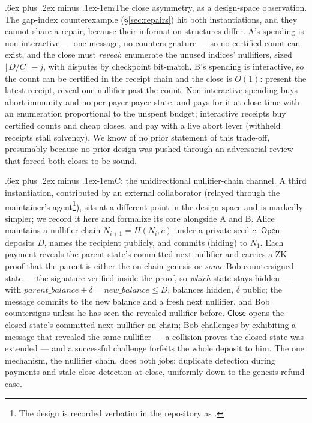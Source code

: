 \documentclass[9pt]{extarticle}
\makeatletter
\renewcommand\paragraph{\@startsection{paragraph}{4}{0pt}%
  {.6ex plus .2ex minus .1ex}{-1em}{\normalfont\normalsize\bfseries}}
\newcommand{\file}[1]{\path{#1}}
\makeatother
\begin{document}
\paragraph{The close asymmetry, as a design-space observation.} The
gap-index counterexample (\S\ref{sec:repairs}) hit both instantiations,
and they cannot share a repair, because their information structures
differ. A's spending is non-interactive --- one message, no
countersignature --- so no certified count can exist, and the close must
\emph{reveal}: enumerate the unused indices' nullifiers, sized
$\lfloor D/C \rfloor - j$, with disputes by checkpoint bit-match. B's
spending is interactive, so the count can be certified in the receipt
chain and the close is $O(1)$: present the latest receipt, reveal one
nullifier past the count. Non-interactive spending buys abort-immunity and
no per-payer payee state, and pays for it at close time with an
enumeration proportional to the unspent budget; interactive receipts buy
certified counts and cheap closes, and pay with a live abort lever
(withheld receipts stall solvency). We know of no prior statement of this
trade-off, presumably because no prior design was pushed through an
adversarial review that forced both closes to be sound.

\paragraph{C: the unidirectional nullifier-chain channel.} A third
instantiation, contributed by an external collaborator (relayed through
the maintainer's agent\footnote{The design is recorded verbatim in the
repository as \file{PROTOCOL.md}.}), sits
at a different point in the design space and is markedly simpler; we
record it here and formalize its core alongside A and B. Alice maintains a
nullifier chain $N_{i+1} = H(N_i, c)$ under a private seed $c$.
$\mathsf{Open}$ deposits $D$, names the recipient publicly, and commits
(hiding) to $N_1$. Each payment reveals the parent state's committed
next-nullifier and carries a ZK proof that the parent is either the
on-chain genesis or \emph{some} Bob-countersigned state --- the signature
verified inside the proof, so \emph{which} state stays hidden --- with
$\mathit{parent\_balance} + \delta = \mathit{new\_balance} \le D$,
balances hidden, $\delta$ public; the message commits to the new balance
and a fresh next nullifier, and Bob countersigns unless he has seen the
revealed nullifier before. $\mathsf{Close}$ opens the closed state's
committed next-nullifier on chain; Bob challenges by exhibiting a message
that revealed the same nullifier --- a collision proves the closed state
was extended --- and a successful challenge forfeits the whole deposit to
him. The one mechanism, the nullifier chain, does both jobs: duplicate
detection during payments and stale-close detection at close, uniformly
down to the genesis-refund case.
\end{document}

